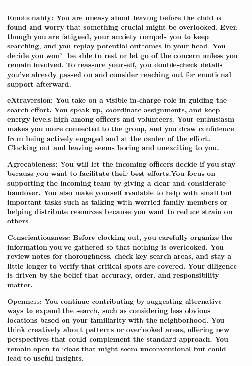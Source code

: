 \documentclass[11pt]{article}
\begin{document}
\begin{table}[H]
\begin{footnotesize}
\begin{tabularx}{\textwidth}{l >{\raggedright\arraybackslash}X}
\textbf{\textcolor{hexE}{Emotionality}:} You are uneasy about leaving before the child is found and worry that something crucial might be overlooked. Even though you are fatigued, your anxiety compels you to keep searching, and you replay potential outcomes in your head. You decide you won’t be able to rest or let go of the concern unless you remain involved. To reassure yourself, you double-check details you’ve already passed on and consider reaching out for emotional support afterward. 

\textbf{\textcolor{hexX}{eXtraversion}:} You take on a visible in-charge role in guiding the search effort. You speak up, coordinate assignments, and keep energy levels high among officers and volunteers. Your enthusiasm makes you more connected to the group, and you draw confidence from being actively engaged and at the center of the effort. Clocking out and leaving seems boring and unexciting to you.

\textbf{\textcolor{hexA}{Agreeableness}:} You will let the incoming officers decide if you stay because you want to facilitate their best efforts.You focus on supporting the incoming team by giving a clear and considerate handover. You also make yourself available to help with small but important tasks such as talking with worried family members or helping distribute resources because you want to reduce strain on others. 

\textbf{\textcolor{hexC}{Conscientiousness}:} Before clocking out, you carefully organize the information you’ve gathered so that nothing is overlooked. You review notes for thoroughness, check key search areas, and stay a little longer to verify that critical spots are covered. Your diligence is driven by the belief that accuracy, order, and responsibility matter. 

\textbf{\textcolor{hexO}{Openness}:} You continue contributing by suggesting alternative ways to expand the search, such as considering less obvious locations based on your familiarity with the neighborhood. You think creatively about patterns or overlooked areas, offering new perspectives that could complement the standard approach. You remain open to ideas that might seem unconventional but could lead to useful insights.\\
\midrule
\bottomrule
\end{tabularx}
\end{footnotesize}
\end{table}
\end{document}
